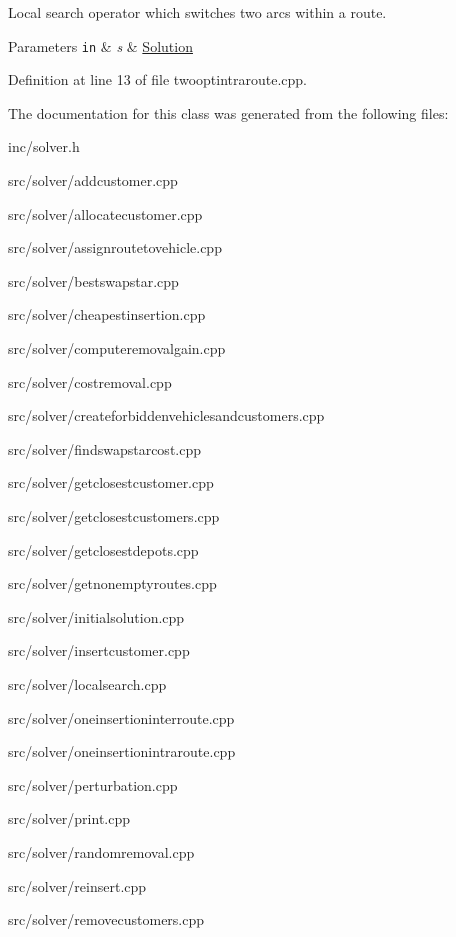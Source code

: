 Local search operator which switches two arcs within a route. 


\begin{DoxyParams}[1]{Parameters}
\mbox{\tt in}  & {\em s} & \hyperlink{class_solution}{Solution} \\
\hline
\end{DoxyParams}


Definition at line 13 of file twooptintraroute.\+cpp.



The documentation for this class was generated from the following files\+:\begin{DoxyCompactItemize}
\item 
inc/solver.\+h\item 
src/solver/addcustomer.\+cpp\item 
src/solver/allocatecustomer.\+cpp\item 
src/solver/assignroutetovehicle.\+cpp\item 
src/solver/bestswapstar.\+cpp\item 
src/solver/cheapestinsertion.\+cpp\item 
src/solver/computeremovalgain.\+cpp\item 
src/solver/costremoval.\+cpp\item 
src/solver/createforbiddenvehiclesandcustomers.\+cpp\item 
src/solver/findswapstarcost.\+cpp\item 
src/solver/getclosestcustomer.\+cpp\item 
src/solver/getclosestcustomers.\+cpp\item 
src/solver/getclosestdepots.\+cpp\item 
src/solver/getnonemptyroutes.\+cpp\item 
src/solver/initialsolution.\+cpp\item 
src/solver/insertcustomer.\+cpp\item 
src/solver/localsearch.\+cpp\item 
src/solver/oneinsertioninterroute.\+cpp\item 
src/solver/oneinsertionintraroute.\+cpp\item 
src/solver/perturbation.\+cpp\item 
src/solver/print.\+cpp\item 
src/solver/randomremoval.\+cpp\item 
src/solver/reinsert.\+cpp\item 
src/solver/removecustomers.\+cpp\item 

\end{DoxyCompactItemize}
